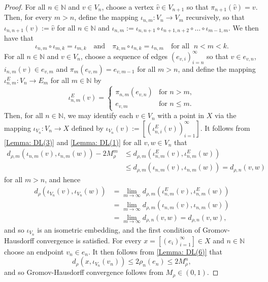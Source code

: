 \documentclass{amsart}
\numberwithin{equation}{section}
\theoremstyle{definition}
\theoremstyle{remark}
\newcommand{\N}{\mathbb{N}}
\begin{document}
\begin{proof}
    For all \(n\in\N\) and \(v\in V_n\), choose a vertex \(\hat{v}\in V_{n+1}\) so that \(\pi_{n+1}(\hat{v})=v\). Then, for every \(m>n\), define the mapping \(\iota_{n,m}\colon V_n\to V_{m}\) recursively, so that \(\iota_{n,n+1}(v):=\hat{v}\) for all \(n\in\N\) and \(\iota_{n,m}:= \iota_{n,n+1}\circ \iota_{n+1,n+2}\circ\ldots\circ \iota_{m-1,m}\). We then have that
        \[
            \iota_{n,m}\circ \iota_{m,k}=\iota_{m,k}\quad\text{and}\quad \pi_{k,m}\circ \iota_{n,k}=\iota_{n,m}\quad\text{for all }\;n<m<k.
        \]
    For all \(n\in\N\) and \(v\in V_n\), choose a sequence of edges \((e_{v,i})_{i=n}^\infty\) so that \(v\in e_{v,n}\), \(i_{n,m}(v)\in e_{v,m}\) and \(\pi_m(e_{v,m})=e_{v,m-1}\) for all \(m>n\), and define the mapping \(\iota_{n,m}^E\colon V_n\to E_m\) for all \(m\in\N\) by
        \[
            \iota_{n,m}^E(v)=\begin{cases}
                \pi_{n,m}(e_{v,n})  &\text{for }n>m,\\
                e_{v,m}             &\text{for }n\leq m.
            \end{cases}
        \]
    Then, for all \(n\in\N\), we may identify each \(v\in V_n\) with a point in \(X\) via the mapping \(\iota_{V_n}\colon V_n\to X\) defined by \(\iota_{V_n}(v):=[(\iota_{n,i}^E(v))_{i=1}^\infty]\). It follows from \ref{Lemma: DL(3)} and \ref{Lemma: DL(1)} for all \(v,w\in V_n\) that
        \[
        \begin{split}
            d_{\rho,m}(\iota_{n,m}(v),\iota_{n,m}(w)) - 2M_\rho^m   &\leq d_{\rho,m}(\iota_{n,m}^E(v),\iota_{n,m}^E(w))\\
            &\leq d_{\rho,m}(\iota_{n,m}(v),\iota_{n,m}(w)) = d_{\rho,n}(v,w)
        \end{split}
        \]
    for all \(m>n\), and hence
        \[
        \begin{split}
            d_{\rho}(\iota_{V_n}(v),\iota_{V_n}(w)) &=\lim_{m\to\infty}d_{\rho,m}(\iota_{n,m}^E(v),\iota_{n,m}^E(w))\\
        &=\lim_{m\to\infty}d_{\rho,m}(\iota_{n,m}(v),\iota_{n,m}(w))\\
        &=\lim_{m\to\infty}d_{\rho,n}(v,w)=d_{\rho,n}(v,w),
        \end{split}
        \]
    and so \(\iota_{V_n}\) is an isometric embedding, and the first condition of Gromov-Hausdorff convergence is satisfied. For every \(x= [(e_i)_{i=1}^\infty]\in X\) and \(n\in\N\) choose an endpoint \(v_n\in e_n\). It then follows from \ref{Lemma: DL(6)} that
        \[
            d_\rho(x,\iota_{V_n}(v_n))\leq 2\rho_n(e_n)\leq 2M_\rho^n,
        \]
    and so Gromov-Hausdorff convergence follows from $M_\rho \in (0,1)$.
\end{proof}
\end{document}
